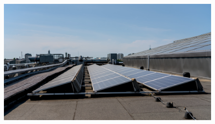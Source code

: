 
\begin{figure}[h]
\centering
\includegraphics[width=0.9\linewidth]{pics/fmikumpula}
\label{fig_fmikumpula_panels}
\end{figure}




